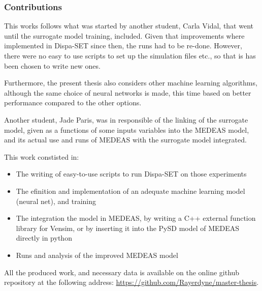


\subsubsection{Contributions}

This works follows what was started by another student, Carla Vidal, that went until the surrogate model training, included. Given that improvements where implemented in Dispa-SET since then, the runs had to be re-done. However, there were no easy to use scripts to set up the simulation files etc., so that is has been chosen to write new ones.

Furthermore, the present thesis also considers other machine learning algorithms, although the same choice of neural networks is made, this time based on better performance compared to the other options.

Another student, Jade Paris, was in responsible of the linking of the surrogate model, given as a functions of some inputs variables into the MEDEAS model, and its actual use and runs of MEDEAS with the surrogate model integrated.

This work constisted in:
\begin{itemize}
    \item The writing of easy-to-use scripts to run Dispa-SET on those experiments
    \item The efinition and implementation of an adequate machine learning model (neural net), and training
    \item The integration the model in MEDEAS, by writing a C++ external function library for Vensim, or by inserting it into the PySD model of MEDEAS directly in python
    \item Runs and analysis of the improved MEDEAS model
\end{itemize}

All the produced work, and necessary data is available on the online github repository at the following address: \href{https://github.com/Rayerdyne/master-thesis}{https://github.com/Rayerdyne/master-thesis}.

